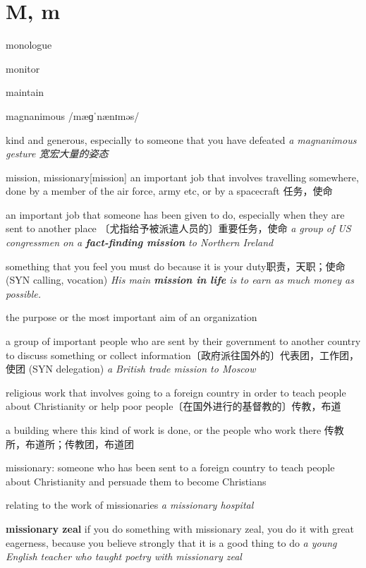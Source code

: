 \section{M, m}

\begin{DefWord}{monologue}
\end{DefWord}

\begin{DefWord}{monitor}
\end{DefWord}

\begin{DefWord}{maintain}
\end{DefWord}

\begin{DefWord}{magnanimous}
    /mæɡˈnænɪməs/

    kind and generous, especially to someone that you have defeated
    \textit{a magnanimous gesture 宽宏大量的姿态}
\end{DefWord}

\begin{DefWord}{mission, missionary}[mission]
    an important job that involves travelling somewhere, done by a member of the air force, army etc, or by a spacecraft 任务，使命

    an important job that someone has been given to do, especially when they are sent to another place 〔尤指给予被派遣人员的〕重要任务，使命
    \textit{a group of US congressmen on a \textbf{fact-finding mission} to Northern Ireland}

    something that you feel you must do because it is your duty职责，天职；使命 (SYN  calling, vocation)
    \textit{His main \textbf{mission in life} is to earn as much money as possible.}

    the purpose or the most important aim of an organization

    a group of important people who are sent by their government to another country to discuss something or collect information〔政府派往国外的〕代表团，工作团，使团 (SYN  delegation)
    \textit{a British trade mission to Moscow}

    religious work that involves going to a foreign country in order to teach people about Christianity or help poor people〔在国外进行的基督教的〕传教，布道

    a building where this kind of work is done, or the people who work there 传教所，布道所；传教团，布道团

    missionary: someone who has been sent to a foreign country to teach people about Christianity and persuade them to become Christians

    relating to the work of missionaries
    \textit{a missionary hospital}

    \textbf{missionary zeal} if you do something with missionary zeal, you do it with great eagerness, because you believe strongly that it is a good thing to do
    \textit{a young English teacher who taught poetry with missionary zeal}
\end{DefWord}

